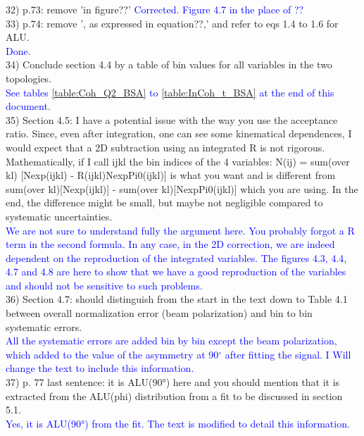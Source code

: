 32) p.73: remove 'in figure??' \textcolor{blue}{ Corrected. Figure 4.7 in the 
place of ??}\\

33) p.74: remove ', as expressed in equation??,' and refer to eqs 1.4 to 1.6 
for ALU.\\
\textcolor{blue}{ Done.}\\

34) Conclude section 4.4 by a table of bin values for all variables in the two 
topologies.\\
\textcolor{blue}{ See tables \ref{table:Coh_Q2_BSA} to \ref{table:InCoh_t_BSA} 
at the end of this document. }\\

35) Section 4.5: I have a potential issue with the way you use the acceptance 
ratio. Since, even after integration, one can see some kinematical dependences, 
I would expect that a 2D subtraction using an integrated R is not rigorous. 
Mathematically, if I call ijkl the bin indices of the 4 variables:
N(ij) = sum(over kl) [Nexp(ijkl) - R(ijkl)NexpPi0(ijkl)] is what you want and 
is different from sum(over kl)[Nexp(ijkl)] -  sum(over kl)[NexpPi0(ijkl)] which 
you are using. In the end, the difference might be small, but maybe not 
negligible compared to systematic uncertainties.\\
\textcolor{blue}{We are not sure to understand fully the argument here. You 
   probably forgot a R term in the second formula. In any case, in the 2D 
   correction, we are indeed dependent on the reproduction of the integrated 
   variables. The figures 4.3, 4.4, 4.7 and 4.8 are here to show that we have a 
   good reproduction of the variables and should not be sensitive to such 
problems. }\\


36) Section 4.7: should distinguish from the start in the text down to Table 
4.1 between overall normalization error (beam polarization) and bin to bin 
systematic errors. \\
\textcolor{blue}{All the systematic errors are added bin by bin except the beam 
polarization, which added to the value of the asymmetry at 90$^{\circ}$ after 
fitting the signal. I Will change the text to include this information.}\\


37) p. 77 last sentence: it is ALU(90°) here and you should mention that it is 
extracted from the ALU(phi) distribution from a fit to be discussed in section 
5.1.\\
\textcolor{blue}{Yes, it is ALU(90°) from the fit. The text is modified to 
detail this information.}\\



